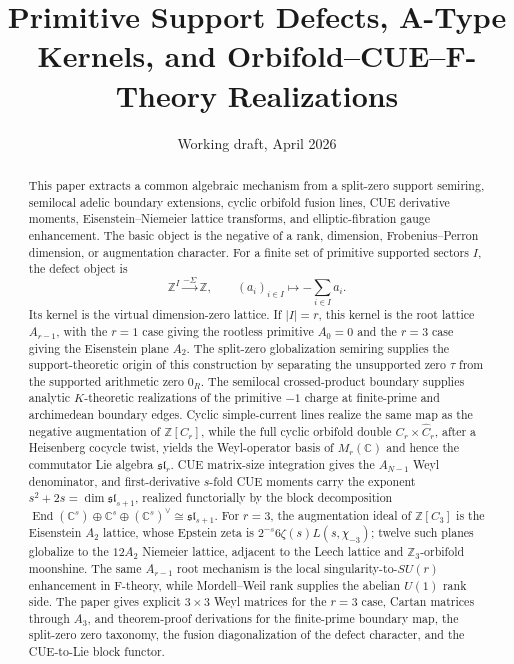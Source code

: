 \documentclass[11pt]{article}
\title{Primitive Support Defects, A-Type Kernels, and Orbifold--CUE--F-Theory Realizations}
\author{}
\date{Working draft, April 2026}
\theoremstyle{remark}
\DeclareMathOperator{\End}{End}
\newcommand{\ZZ}{\mathbb Z}
\newcommand{\CC}{\mathbb C}
\begin{document}
\maketitle

\begin{abstract}
This paper extracts a common algebraic mechanism from a split-zero support semiring, semilocal adelic boundary extensions, cyclic orbifold fusion lines, CUE derivative moments, Eisenstein--Niemeier lattice transforms, and elliptic-fibration gauge enhancement.  The basic object is the negative of a rank, dimension, Frobenius--Perron dimension, or augmentation character.  For a finite set of primitive supported sectors $I$, the defect object is
\[
        \ZZ^I \xrightarrow{-\Sigma} \ZZ,
        \qquad (a_i)_{i\in I}\longmapsto -\sum_{i\in I}a_i.
\]
Its kernel is the virtual dimension-zero lattice.  If $|I|=r$, this kernel is the root lattice $A_{r-1}$, with the $r=1$ case giving the rootless primitive $A_0=0$ and the $r=3$ case giving the Eisenstein plane $A_2$.  The split-zero globalization semiring supplies the support-theoretic origin of this construction by separating the unsupported zero $\tau$ from the supported arithmetic zero $0_R$.  The semilocal crossed-product boundary supplies analytic $K$-theoretic realizations of the primitive $-1$ charge at finite-prime and archimedean boundary edges.  Cyclic simple-current lines realize the same map as the negative augmentation of $\ZZ[C_r]$, while the full cyclic orbifold double $C_r\times\widehat C_r$, after a Heisenberg cocycle twist, yields the Weyl-operator basis of $M_r(\CC)$ and hence the commutator Lie algebra $\mathfrak{sl}_r$.  CUE matrix-size integration gives the $A_{N-1}$ Weyl denominator, and first-derivative $s$-fold CUE moments carry the exponent $s^2+2s=\dim\mathfrak{sl}_{s+1}$, realized functorially by the block decomposition $\End(\CC^s)\oplus\CC^s\oplus(\CC^s)^\vee\cong\mathfrak{sl}_{s+1}$.  For $r=3$, the augmentation ideal of $\ZZ[C_3]$ is the Eisenstein $A_2$ lattice, whose Epstein zeta is $2^{-s}6\zeta(s)L(s,\chi_{-3})$; twelve such planes globalize to the $12A_2$ Niemeier lattice, adjacent to the Leech lattice and $\ZZ_3$-orbifold moonshine.  The same $A_{r-1}$ root mechanism is the local singularity-to-$SU(r)$ enhancement in F-theory, while Mordell--Weil rank supplies the abelian $U(1)$ rank side.  The paper gives explicit $3\times3$ Weyl matrices for the $r=3$ case, Cartan matrices through $A_3$, and theorem-proof derivations for the finite-prime boundary map, the split-zero zero taxonomy, the fusion diagonalization of the defect character, and the CUE-to-Lie block functor.
\end{abstract}
\end{document}
